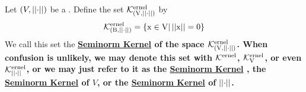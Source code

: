 \label{def:seminormkernel}
\newcommand{\SeminormKernel}[0]{
    \bf \hyperref[def:seminormkernel]{Seminorm Kernel} \rm
}
\newcommand{\SeminormKernels}[0]{
    \bf \hyperref[def:seminormkernel]{Seminorm Kernels} \rm
}
\newcommand{\Ker}[0]{
   \bf\mathcal{K}\rm^{ernel}
}


\begin{df}
Let $(V, \left|\left| \cdot \right|\right|)$ be a \SeminormedSpace. 
Define the set $\Ker_{(V,\norm{\cdot})}$ by 
\begin{equation}
\Ker_{(B,\norm{\cdot})}=\{x \in V | \norm{x}=0\}
\end{equation}
We call this set the \SeminormKernel of the space $\Ker_{(V,\norm{\cdot})}$. 
When confusion is unlikely, we may denote this set with
$\Ker$, $\Ker_V$, or even $\Ker_{\norm{\cdot}}$, or we may just refer to it
as the \SeminormKernel, the \SeminormKernel of $V$, or the \SeminormKernel of $\left|\left| \cdot \right|\right|$. 
\end{df}

